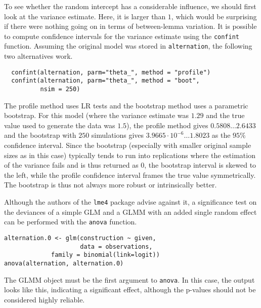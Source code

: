 To see whether the random intercept has a considerable influence, we should first look at the variance estimate.
Here, it is larger than $1$, which would be surprising if there were nothing going on in terms of between-lemma variation.
It is possible to compute confidence intervals for the variance estimate using the \texttt{confint} function.
Assuming the original model was stored in \texttt{alternation}, the following two alternatives work.

\vspace{0.5\baselineskip}

\begin{lstlisting}
  confint(alternation, parm="theta_", method = "profile")
  confint(alternation, parm="theta_", method = "boot",
          nsim = 250)
\end{lstlisting}

The profile method uses LR tests and the bootstrap method uses a parametric bootstrap.
For this model (where the variance estimate was $1.29$ and the true value used to generate the data was $1.5$), the profile method gives $0.5808\dots2.6433$ and the bootstrap with $250$ simulations gives $3.9665\cdot10^{-6}\dots1.8023$ as the $95\%$ confidence interval.
Since the bootstrap (especially with smaller original sample sizes as in this case) typically tends to run into replications where the estimation of the variance fails and is thus returned as $0$, the bootstrap interval is skewed to the left, while the profile confidence interval frames the true value symmetrically.
The bootstrap is thus not always more robust or intrinsically better.

Although the authors of the \texttt{lme4} package advise against it, a significance test on the deviances of a simple GLM and a GLMM with an added single random effect can be performed with the \texttt{anova} function.

\vspace{0.5\baselineskip}

\begin{lstlisting}
alternation.0 <- glm(construction ~ given,
                     data = observations,
		     family = binomial(link=logit))
anova(alternation, alternation.0)
\end{lstlisting}

The GLMM object must be the first argument to \texttt{anova}.
In this case, the output looks like this, indicating a significant effect, although the p-values should not be considered highly reliable.

\vspace{0.5\baselineskip}

